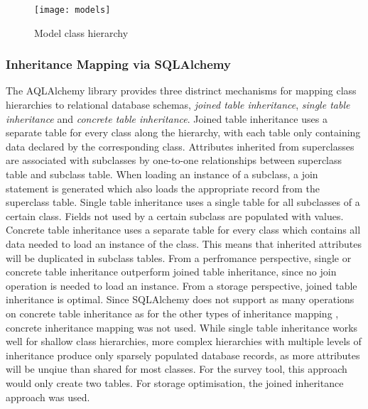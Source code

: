         \begin{figure}
            \centering
            \texttt{[image: models]}
            \caption{Model class hierarchy}
            \label{fig:model-dia}
        \end{figure}

    \subsubsection{Inheritance Mapping via SQLAlchemy}
        The AQLAlchemy library provides three distrinct mechanisms
        for mapping class hierarchies to relational database schemas,
        \textit{joined table inheritance}, \textit{single table inheritance}
        and \textit{concrete table inheritance}.
        Joined table inheritance uses a separate table for every
        class along the hierarchy, with each table only
        containing data declared by the corresponding class.
        Attributes inherited from superclasses are associated
        with subclasses by one-to-one relationships between
        superclass table and subclass table. When loading
        an instance of a subclass, a join statement is generated
        which also loads the appropriate record from the superclass
        table. Single table inheritance uses a single table
        for all subclasses of a certain class. Fields
        not used by a certain subclass are populated with 
        values. Concrete table inheritance uses a separate table for
        every class which contains all data needed to load an
        instance of the class. This means that inherited attributes
        will be duplicated in subclass tables.
        From a perfromance perspective, single or concrete table
        inheritance outperform joined table inheritance, since
        no join operation is needed to load an instance.
        From a storage perspective, joined table inheritance is
        optimal. Since SQLAlchemy does not support as many
        operations on concrete table inheritance as for the
        other types of inheritance mapping \cite{sqla-inheritance}, concrete inheritance
        mapping was not used. While single table inheritance
        works well for shallow class hierarchies, more
        complex hierarchies with multiple levels of inheritance
        produce only sparsely populated database records, as more attributes
        will be unqiue than shared for most classes.
        For the survey tool, this approach would only create
        two tables. For storage optimisation, the joined
        inheritance approach was used.

